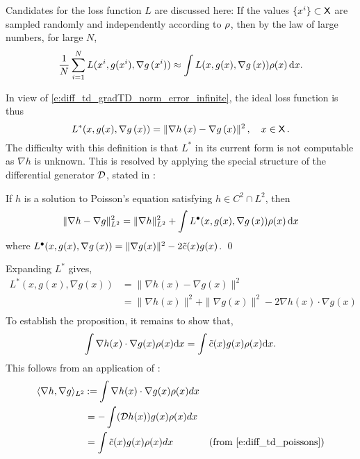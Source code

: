 Candidates for the loss function $L$ are discussed here: 
If the values $\{x^i\} \subset {\sf X} $  are sampled randomly and independently according to $\rho$,  then by the law of large numbers, for large $N$,
\begin{equation}
\frac{1}{N} \sum_{i=1}^N L(x^i, g(x^i), \nabla g\, (x^i))  \approx
\int  L(x, g(x), \nabla g\, (x))  \rho(x)\, \text{d} x.
\end{equation}

In view of \eqref{e:diff_td_gradTD_norm_error_infinite}, the ideal loss function is thus
\begin{equation}
L^*(x,g(x) ,\nabla g \,(x))  =         \| \nabla h\,(x)  -\nabla g\, (x) \|^2\,, \quad x\in\state\,.
\label{e:rkhs_IdealLoss}
\end{equation}
The difficulty with this definition is that $L^*$ in its current form is not computable as $\nabla h$ is unknown. This is resolved by applying the special structure of the differential generator ${\cal D}$,  stated in :
\begin{proposition}
	\label{prop:gradTD_erm_loss}
	If $h$ is a solution to Poisson's equation satisfying $h\in C^2\cap L^2$, then
	\[
	\| \nabla h -  \nabla g\|^2_{L^2} =\| \nabla h  \|^2_{L^2} + \int   L^\bullet(x, g(x), \nabla g\, (x)) \rho(x)\, \text{d} x
	\]
	where
	$ L^\bullet(x, g(x), \nabla g\, (x)) =   \| \nabla g(x)\|^2   - 2 \tilde c(x) g(x)$.
	\qed
\end{proposition}
Expanding $L^*$ gives,	
\[
\begin{aligned}
L^*(x,g(x),\nabla g(x)) & = \| \nabla h(x) - \nabla g(x) \|^2 \\
& = \| \nabla h(x) \|^2 + \| \nabla g(x) \|^2- 2 \nabla h(x) \cdot \nabla g(x) \\
\end{aligned}
\]
To establish the proposition, it remains to show that,
\[
\int \nabla h(x) \cdot \nabla g(x) \pr(x) \ud x = \int \tilc(x) g(x) \pr(x) \ud x.
\label{e:rkhs_transform}
\]
This follows from an application of :
\[
\begin{aligned}
\langle \nabla h, \nabla g \rangle_{L^2} & \mathbin{:=} \int \nabla h(x) \cdot \nabla g(x) \rho(x) dx \\
& = - \int  ({\cal D} h(x)) g(x) \rho(x) dx \\
& = \int \tilde c(x) g(x) \rho(x) dx \qquad & \text{(from \eqref{e:diff_td_poissons})}
\end{aligned}
\]
